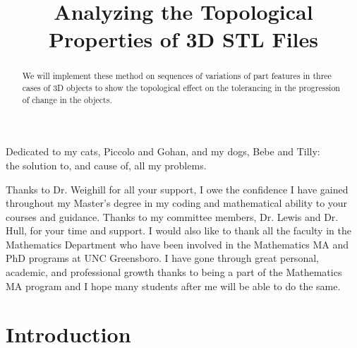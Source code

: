\documentclass[ma]{uncgdissertationexp}
\title{Analyzing the Topological Properties of 3D STL Files}
\theoremstyle{plain}
\theoremstyle{definition}
\theoremstyle{remark}
\begin{document}
\frontmatter      %
\begin{abstract}
We will implement these method on sequences of variations of part features in three cases of 3D objects to show the topological effect on the tolerancing in the progression of change in the objects.
\end{abstract}
\maketitlepage  
\makecopyrightpage
\begin{dedication}
Dedicated to my cats, Piccolo and Gohan, and my dogs, Bebe and Tilly:\\
the solution to, and cause of, all my problems.
\end{dedication}
\makeapprovalpage
\begin{acknowledgments}
\par Thanks to Dr. Weighill for all your support, I owe the confidence I have gained throughout my Master's degree in my coding and mathematical ability to your courses and guidance. Thanks to my committee members, Dr. Lewis and Dr. Hull, for your time and support. I would also like to thank all the faculty in the Mathematics Department who have been involved in the Mathematics MA and PhD programs at UNC Greensboro. I have gone through great personal, academic, and professional growth thanks to being a part of the Mathematics MA program and I hope many students after me will be able to do the same.
\end{acknowledgments}
\tableofcontents
\listoffigures
\mainmatter

\chapter{Introduction}
\end{document}
